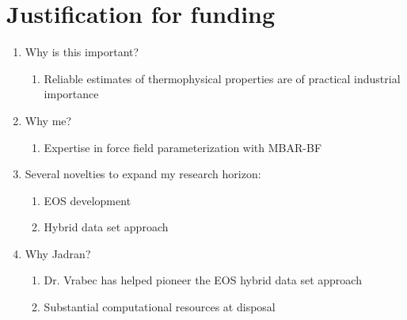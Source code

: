 \documentclass[11pt,a4paper]{article}
\begin{document}
\section{Justification for funding}
\begin{enumerate}
    \item Why is this important?
    \begin{enumerate}
	    \item Reliable estimates of thermophysical properties are of practical industrial importance
    \end{enumerate}	
    \item Why me?
    \begin{enumerate}
	    \item Expertise in force field parameterization with MBAR-BF
	\end{enumerate}
	\item Several novelties to expand my research horizon:
	\begin{enumerate}
		\item EOS development
		\item Hybrid data set approach
	\end{enumerate}
    \item Why Jadran?
    \begin{enumerate}
	    \item Dr. Vrabec has helped pioneer the EOS hybrid data set approach
	    \item Substantial computational resources at disposal
    \end{enumerate}
\end{enumerate}
\end{document}
